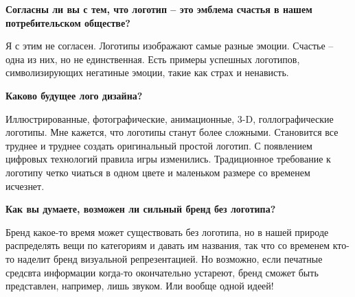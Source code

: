 \textbf{Согласны ли вы с тем, что логотип – это эмблема счастья в нашем потребительском обществе?}

Я с этим не согласен. Логотипы изображают самые разные эмоции. Счастье – одна из них, но не единственная. Есть примеры успешных логотипов, символизирующих негатиные эмоции, такие как страх и ненависть.

\textbf{Каково будущее лого дизайна?}

Иллюстрированные, фотографические, анимационные, 3-D, голлографические логотипы. Мне кажется, что логотипы станут более сложными. Становится все труднее и труднее создать оригинальный простой логотип. С появлением цифровых технологий правила игры изменились. Традиционное требование к логотипу четко чиаться в одном цвете и маленьком размере со временем исчезнет.

\textbf{Как вы думаете, возможен ли сильный бренд без логотипа?}

Бренд какое-то время может существовать без логотипа, но в нашей природе распределять вещи по категориям и давать им названия, так что со временем кто-то наделит бренд визуальной репрезентацией. Но возможно, если печатные средсвта информации когда-то окончательно устареют, бренд сможет быть представлен, например, лишь звуком. Или вообще одной идеей!
